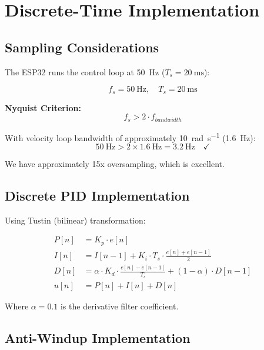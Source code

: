 \documentclass[11pt,letterpaper]{article}
\begin{document}
\newpage
\section{Discrete-Time Implementation}

\subsection{Sampling Considerations}

The ESP32 runs the control loop at \SI{50}{\hertz} ($T_s = \SI{20}{\milli\second}$):

\begin{equation}
f_s = \SI{50}{\hertz}, \quad T_s = \SI{20}{\milli\second}
\end{equation}

\textbf{Nyquist Criterion:}
\begin{equation}
f_s > 2 \cdot f_{bandwidth}
\end{equation}

With velocity loop bandwidth of approximately \SI{10}{\radian\per\second} (\SI{1.6}{\hertz}):
\begin{equation}
\SI{50}{\hertz} > 2 \times \SI{1.6}{\hertz} = \SI{3.2}{\hertz} \quad \checkmark
\end{equation}

We have approximately 15x oversampling, which is excellent.

\subsection{Discrete PID Implementation}

Using Tustin (bilinear) transformation:

\begin{align}
P[n] &= K_p \cdot e[n] \\
I[n] &= I[n-1] + K_i \cdot T_s \cdot \frac{e[n] + e[n-1]}{2} \\
D[n] &= \alpha \cdot K_d \cdot \frac{e[n] - e[n-1]}{T_s} + (1-\alpha) \cdot D[n-1] \\
u[n] &= P[n] + I[n] + D[n]
\end{align}

Where $\alpha = 0.1$ is the derivative filter coefficient.

\subsection{Anti-Windup Implementation}
\end{document}
